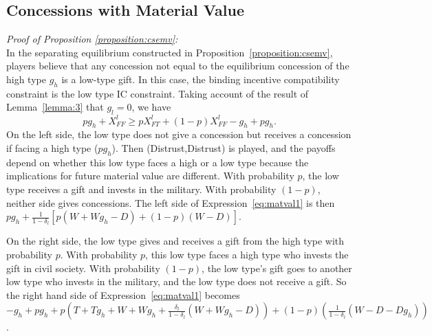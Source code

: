 \documentclass[bibtex,autowc]{apsr_submission}
\newcommand{\de}{\delta}
\begin{document}
{\subsection{Concessions with Material Value}
\label{ap:mat_val}
\emph{Proof of Proposition \ref{proposition:csemv}:}\\
In the separating equilibrium constructed in Proposition~\ref{proposition:csemv}, players believe that any concession not equal to the equilibrium concession of the high type $g_h$ is a low-type gift. In this case, the binding incentive compatibility constraint is the low type IC constraint. Taking account of the result of  Lemma~\ref{lemma:3} that $g_l=0$, we have
\begin{equation}
	pg_h +X_{FF}^l \geq pX_{FT}^l+(1-p)X_{FF}^l-g_h+pg_h.
	\label{eq:matval1}
\end{equation}
On the left side, the low type does not give a concession but receives a concession if facing a high type ($pg_h$). Then (Distrust,Distrust) is played, and the payoffs depend on whether this low type faces a high or a low type because the implications for future material value are different. With probability $p$, the low type receives a gift and invests in the military. With probability $(1-p)$, neither side gives concessions. The left side of Expression~\ref{eq:matval1} is then $pg_h + \frac{1}{1-\de_l}\left[p(W+Wg_h-D) + (1-p)(W-D) \right]$.

On the right side, the low type gives and receives a gift from the high type with probability $p$. With probability $p$, this low type faces a high type who invests the gift in civil society. With probability $(1-p)$, the low type's gift goes to another low type who invests in the military, and the low type does not receive a gift. So the right hand side of Expression~\ref{eq:matval1} becomes $-g_h + pg_h + p\left(T + Tg_h +W + Wg_h + \frac{\de_l}{1-\de_l}\left(W + Wg_h-D \right) \right) + (1-p)\left( \frac{1}{1-\de_l}\left(W-D-Dg_h \right) \right)$.

}
\end{document}
